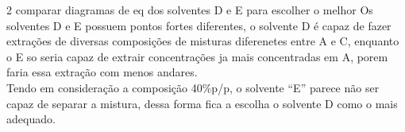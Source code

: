 \documentclass[\mainfilename]{subfiles}
\begin{document}
\begin{questionBox}2{ %
    comparar diagramas de eq dos solventes D e E para escolher o melhor
} %
    \answer{}
    Os solventes D e E possuem pontos fortes diferentes, o solvente D é capaz de fazer extrações de diversas composições de misturas diferenetes entre A e C, enquanto o E so seria capaz de extrair concentrações ja mais concentradas em A, porem faria essa extração com menos andares.\\

    Tendo em consideração a composição 40\%p/p, o solvente ``E'' parece não ser capaz de separar a mistura, dessa forma fica a escolha o solvente D como o mais adequado.
\end{questionBox}
\end{document}
